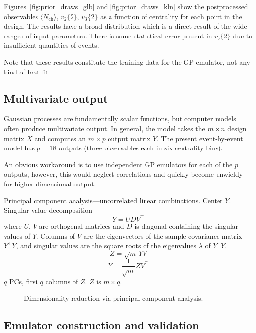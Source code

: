 \documentclass[aps,prc,reprint,amsmath]{revtex4-1}
\newcommand{\placeholderfig}[3][t]{
  \begin{figure}[#1]
    \centering
    \framebox{\parbox[c][.5\columnwidth]{\columnwidth}{
      placeholder
    }}
    \caption{\label{fig:#2}#3}
  \end{figure}
}
\newcommand{\avg}[1]{\langle #1 \rangle}
\newcommand{\nch}{N_\text{ch}}
\newcommand{\vnk}[2]{v_#1\{#2\}}
\newcommand{\tran}{^\intercal}
\begin{document}
Figures~\ref{fig:prior_draws_glb} and \ref{fig:prior_draws_kln} show the postprocessed observables $\avg\nch$, $\vnk 2 2$, $\vnk 3 2$ as a function of centrality for each point in the design.
The results have a broad distribution which is a direct result of the wide ranges of input parameters.
There is some statistical error present in $\vnk 3 2$ due to insufficient quantities of events.

Note that these results constitute the training data for the GP emulator, not any kind of best-fit.

\subsection{Multivariate output}

Gaussian processes are fundamentally scalar functions, but computer models often produce multivariate output.
In general, the model takes the $m \times n$ design matrix $X$ and computes an $m \times p$ output matrix $Y$.
The present event-by-event model has $p = 18$ outputs (three observables each in six centrality bins).

An obvious workaround is to use independent GP emulators for each of the $p$ outputs, however, this would neglect correlations and quickly become unwieldy for higher-dimensional output.

Principal component analysis---uncorrelated linear combinations.
Center $Y$.
Singular value decomposition
\begin{equation}
  Y = UDV\tran
\end{equation}
where $U$, $V$ are orthogonal matrices and $D$ is diagonal containing the singular values of $Y$.
Columns of $V$ are the eigenvectors of the sample covariance matrix $Y\tran Y$, and singular values are the square roots of the eigenvalues $\lambda$ of $Y\tran Y$.
\begin{equation}
  Z = \sqrt m \, YV
\end{equation}
\begin{equation}
  Y = \frac{1}{\sqrt m} ZV\tran
\end{equation}
$q$ PCs, first $q$ columns of $Z$.  $Z$ is $m \times q$.


\placeholderfig{pca}{
  Dimensionality reduction via principal component analysis.
}

\subsection{Emulator construction and validation}
\end{document}
